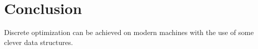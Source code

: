 \chapter{Conclusion}
\label{conclusion}

Discrete optimization can be achieved on modern machines with the use of some clever data structures.
